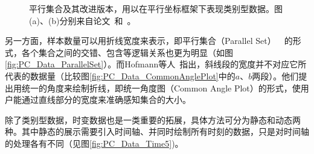 \documentclass[12pt,twocolumn]{article}
\begin{document}
\begin{figure}[!htb]
\centering
{}
\caption{平行集合及其改进版本，用以在平行坐标框架下表现类别型数据。图(a)、(b)分别来自论文~\citep{kosara2006parallel}和~\citep{hofmann2013common}。}
\end{figure}

另一方面，样本数量可以用折线宽度来表示，即平行集合（Parallel Set）~\citep{kosara2006parallel}~\citep{bendix2005parallel}的形式，各个集合之间的交错、包含等逻辑关系也更为明显（如图\ref{fig:PC_Data_ParallelSet}）。而Hofmann等人~\citep{hofmann2013common}指出，斜线段的宽度并不对应它所代表的数据量（比较图\ref{fig:PC_Data_CommonAnglePlot}中的$a$、$b$两段）。他们提出用统一的角度来绘制折线，即统一角度图（Common Angle Plot）的形式，使用户能通过直线部分的宽度来准确感知集合的大小。

除了类别型数据，时变数据也是一类重要的拓展，具体方法可分为静态和动态两种。其中静态的展示需要引入时间轴、并同时绘制所有时刻的数据，只是对时间轴的处理各有不同（见图\ref{fig:PC_Data_Time5})。
\end{document}
